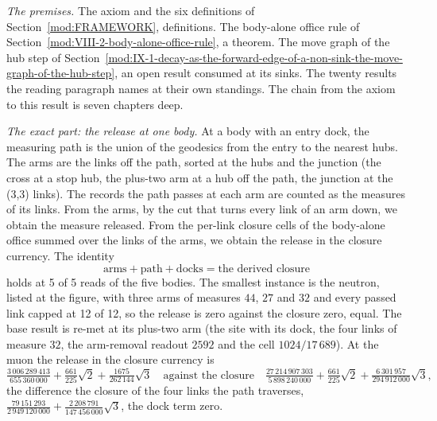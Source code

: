 \begin{chproof}
\textit{The premises.} The axiom and the six definitions of Section~\ref{mod:FRAMEWORK}, definitions. The body-alone office rule of Section~\ref{mod:VIII-2-body-alone-office-rule}, a theorem. The move graph of the hub step of Section~\ref{mod:IX-1-decay-as-the-forward-edge-of-a-non-sink-the-move-graph-of-the-hub-step}, an open result consumed at its sinks. The twenty results the reading paragraph names at their own standings. The chain from the axiom to this result is seven chapters deep.

\textit{The exact part: the release at one body.} At a body with an entry dock, the measuring path is the union of the geodesics from the entry to the nearest hubs. The arms are the links off the path, sorted at the hubs and the junction (the cross at a stop hub, the plus-two arm at a hub off the path, the junction at the (3,3) links). The records the path passes at each arm are counted as the measures of its links. From the arms, by the cut that turns every link of an arm down, we obtain the measure released. From the per-link closure cells of the body-alone office summed over the links of the arms, we obtain the release in the closure currency. The identity
\begin{equation}
\text{arms}+\text{path}+\text{docks}=\text{the derived closure}
\end{equation}
holds at 5 of 5 reads of the five bodies. The smallest instance is the neutron, listed at the figure, with three arms of measures $44$, $27$ and $32$ and every passed link capped at 12 of 12, so the release is zero against the closure zero, equal. The base result is re-met at its plus-two arm (the site with its dock, the four links of measure $32$, the arm-removal readout $2592$ and the cell $1024/17\,689$). At the muon the release in the closure currency is
\begin{equation}
\tfrac{3\,006\,289\,413}{655\,360\,000}+\tfrac{661}{225}\sqrt{2}+\tfrac{1675}{262\,144}\sqrt{3}
\quad\text{against the closure}\quad
\tfrac{27\,214\,907\,303}{5\,898\,240\,000}+\tfrac{661}{225}\sqrt{2}+\tfrac{6\,301\,957}{294\,912\,000}\sqrt{3},
\end{equation}
the difference the closure of the four links the path traverses, $\tfrac{79\,151\,293}{2\,949\,120\,000}+\tfrac{2\,208\,791}{147\,456\,000}\sqrt{3}$, the dock term zero.


\end{chproof}
